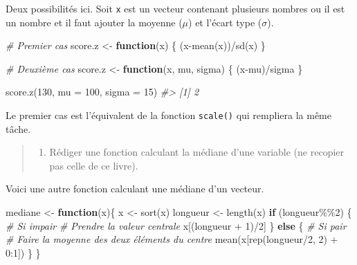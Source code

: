 \documentclass[
]{book}
\newenvironment{Shaded}{}{}
\newcommand{\AttributeTok}[1]{#1}
\newcommand{\CommentTok}[1]{\textit{#1}}
\newcommand{\ControlFlowTok}[1]{\textbf{#1}}
\newcommand{\DecValTok}[1]{#1}
\newcommand{\FunctionTok}[1]{#1}
\newcommand{\NormalTok}[1]{#1}
\newcommand{\OtherTok}[1]{#1}
\newcommand{\SpecialCharTok}[1]{#1}
\providecommand{\tightlist}{%
  \setlength{\itemsep}{0pt}\setlength{\parskip}{0pt}}
\begin{document}
Deux possibilités ici. Soit \texttt{x} est un vecteur contenant plusieurs nombres ou il est un nombre et il faut ajouter la moyenne (\(\mu\)) et l'écart type (\(\sigma\)).

\begin{Shaded}
\begin{Highlighting}[]
\CommentTok{\# Premier cas}
\NormalTok{score.z }\OtherTok{\textless{}{-}} \ControlFlowTok{function}\NormalTok{(x) \{}
\NormalTok{  (x}\SpecialCharTok{{-}}\FunctionTok{mean}\NormalTok{(x))}\SpecialCharTok{/}\FunctionTok{sd}\NormalTok{(x)}
\NormalTok{\} }

\CommentTok{\# Deuxième cas}
\NormalTok{score.z }\OtherTok{\textless{}{-}} \ControlFlowTok{function}\NormalTok{(x, mu, sigma) \{}
\NormalTok{  (x}\SpecialCharTok{{-}}\NormalTok{mu)}\SpecialCharTok{/}\NormalTok{sigma}
\NormalTok{\} }

\FunctionTok{score.z}\NormalTok{(}\DecValTok{130}\NormalTok{, }\AttributeTok{mu =} \DecValTok{100}\NormalTok{, }\AttributeTok{sigma =} \DecValTok{15}\NormalTok{)}
\CommentTok{\#\textgreater{} [1] 2}
\end{Highlighting}
\end{Shaded}

Le premier cas est l'équivalent de la fonction \texttt{scale()} qui rempliera la même tâche.

\begin{quote}
\begin{enumerate}
\def\labelenumi{\arabic{enumi}.}
\setcounter{enumi}{3}
\tightlist
\item
  Rédiger une fonction calculant la médiane d'une variable (ne recopier pas celle de ce livre).
\end{enumerate}
\end{quote}

Voici une autre fonction calculant une médiane d'un vecteur.

\begin{Shaded}
\begin{Highlighting}[]
\NormalTok{mediane }\OtherTok{\textless{}{-}} \ControlFlowTok{function}\NormalTok{(x)\{}
\NormalTok{  x }\OtherTok{\textless{}{-}} \FunctionTok{sort}\NormalTok{(x)}
\NormalTok{  longueur }\OtherTok{\textless{}{-}} \FunctionTok{length}\NormalTok{(x)}
  \ControlFlowTok{if}\NormalTok{ (longueur}\SpecialCharTok{\%\%}\DecValTok{2}\NormalTok{) \{}
    \CommentTok{\# Si impair}
    \CommentTok{\# Prendre la valeur centrale}
\NormalTok{    x[(longueur }\SpecialCharTok{+} \DecValTok{1}\NormalTok{)}\SpecialCharTok{/}\DecValTok{2}\NormalTok{]}
\NormalTok{  \} }\ControlFlowTok{else}\NormalTok{ \{}
    \CommentTok{\# Si pair}
    \CommentTok{\# Faire la moyenne des deux éléments du centre}
    \FunctionTok{mean}\NormalTok{(x[}\FunctionTok{rep}\NormalTok{(longueur}\SpecialCharTok{/}\DecValTok{2}\NormalTok{, }\DecValTok{2}\NormalTok{) }\SpecialCharTok{+} \DecValTok{0}\SpecialCharTok{:}\DecValTok{1}\NormalTok{])}
\NormalTok{  \}}
\NormalTok{\}}
\end{Highlighting}
\end{Shaded}
\end{document}
